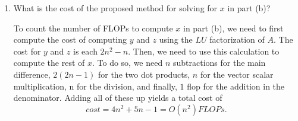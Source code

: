 \documentclass[a4paper,12pt]{article}
\begin{document}
\begin{enumerate}[label = \arabic*.]
\begin{enumerate}[label = (\alph*)]
				\item What is the cost of the proposed method for solving for $ x $ in part (b)?
				
				To count the number of FLOPs to compute $ x $ in part (b), we need to first compute the cost of computing $ y $ and $ z $ using the $ LU $ factorization of $ A $. The cost for $ y $ and $ z $ is each $ 2n^2 - n $. Then, we need to use this calculation to compute the rest of $ x $. To do so, we need $ n $ subtractions for the main difference, $ 2(2n - 1) $ for the two dot products, $ n $ for the vector scalar multiplication, n for the division, and finally, $ 1 $ flop for the addition in the denominator. Adding all of these up yields a total cost of
				\[
					cost = 4n^2 + 5n - 1 = O(n^2) FLOPs.
				\]
				
			\end{enumerate}
\end{enumerate}
\end{document}
